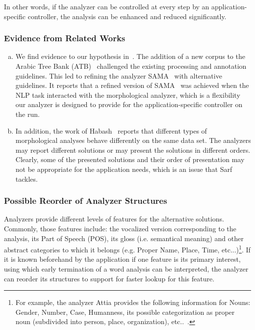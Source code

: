 \documentclass[a4,12pt]{report}
\begin{document}
In other words, if the analyzer can be controlled at every step by an application-specific
controller, the analysis can be enhanced and reduced significantly.

\subsubsection{Evidence from Related Works}

\begin{enumerate}[a)]

\item We find evidence to our hypothesis in~\cite{Maamouri:10}.
The addition of a new corpus to the Arabic Tree Bank 
(ATB)~\cite{Maamouri:04}
challenged the existing processing and 
annotation guidelines. 
This led to refining 
the analyzer SAMA~\cite{Kulick:10} with 
alternative guidelines. 
It reports that a refined version of SAMA~\cite{Kulick:10} was achieved when the NLP 
task interacted with the morphological analyzer, which is
a flexibility our analyzer is designed to provide for the application-specific controller on the run.

\item In addition, 
the work of Habash~\cite{Habash:06} reports that different 
types of morphological analyses behave differently on the same %
data set.
The analyzers may report different solutions or 
may present the solutions in different orders. 
Clearly, some of 
the presented solutions and their order of presentation may not be 
appropriate for the %
application needs, which is an issue that Sarf tackles. %
\end{enumerate}

\subsubsection{Possible Reorder of Analyzer Structures}

Analyzers provide different levels of features for the alternative solutions.
Commonly, those features include: the vocalized version corresponding to the analysis,
its Part of Speech (POS), its gloss (i.e. semantical meaning) and other abstract categories to which
it belongs (e.g. Proper Name, Place, Time, etc...)\footnote{For example, the analyzer Attia 
provides the following information for Nouns: Gender, Number, Case, Humanness, its possible
categorization as proper noun (subdivided into person, place, organization), etc..~\cite{Attia:08a}.}.
If it is known beforehand by the application if one feature is its primary interest, using which
early termination of a word analysis can be interpreted, the analyzer can reorder its structures to support for
faster lookup for this feature.
\end{document}
